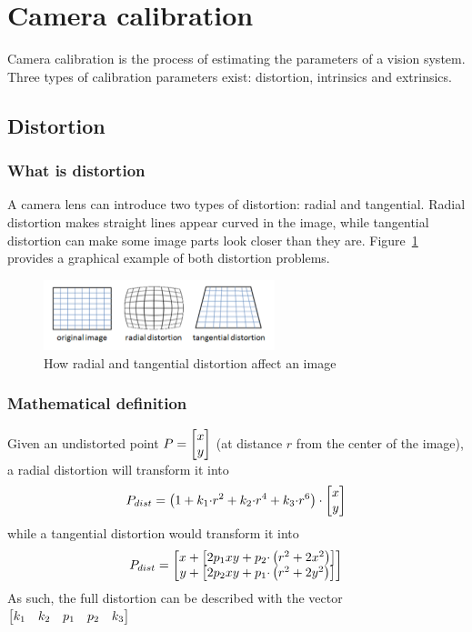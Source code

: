 \section{Camera calibration}

Camera calibration is the process of estimating the parameters of a vision system.
Three types of calibration parameters exist: distortion, intrinsics and extrinsics.

\subsection[Distortion]{Distortion~\cite{calib-dist}}

\subsubsection{What is distortion}

A camera lens can introduce two types of distortion: radial and tangential.
Radial distortion makes straight lines appear curved in the image, while tangential distortion can make some image parts look closer than they are.
Figure~\ref{fig:distortion} provides a graphical example of both distortion problems.

\begin{figure}
	\centerline{\includegraphics[width=0.6\textwidth]{images/distortion.png}}
	\caption{\centering How radial and tangential distortion affect an image}
	\label{fig:distortion}
\end{figure}

\subsubsection{Mathematical definition}

Given an undistorted point $P=\begin{bmatrix} x \\ y \end{bmatrix}$ (at distance $r$ from the center of the image), a radial distortion will transform it into
\begin{equation}
	P_{dist} = \left( 1 + k_1{\cdot}r^2 + k_2{\cdot}r^4 + k_3{\cdot}r^6 \right) \cdot \begin{bmatrix} x \\ y \end{bmatrix}
\end{equation}
while a tangential distortion would transform it into
\begin{equation}
	P_{dist} = \begin{bmatrix} x+\left[ 2p_1xy + p_2{\cdot}\left( r^2+2x^2 \right) \right] \\ y+\left[ 2p_2xy + p_1{\cdot}\left( r^2+2y^2 \right) \right] \end{bmatrix}
\end{equation}
As such, the full distortion can be described with the vector $\begin{bmatrix} k_1 & k_2 & p_1 & p_2 & k_3 \end{bmatrix}$

